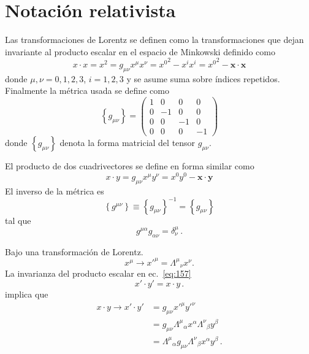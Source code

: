 \section{Notaci\'on relativista}
\label{sec:srn}
\begin{frame}
Las transformaciones de Lorentz se definen como la transformaciones que dejan invariante al producto escalar en el espacio de Minkowski definido como
\begin{equation}
  \label{eq:146}
 x\cdot x= x^2=g_{\mu\nu}x^\mu x^\nu={x^0}^2-x^i x^i={x^0}^2-\mathbf{x}\cdot\mathbf{x}
\end{equation}
donde $\mu,\nu=0,1,2,3$, $i=1,2,3$ y se asume suma sobre índices repetidos.
Finalmente la métrica usada se define como
\begin{equation}
  \label{eq:gmunu}
  \left\{ g_{\mu\nu} \right\}=
  \begin{pmatrix}
    1&0&0&0\\
    0&-1&0&0\\
    0&0&-1&0\\
    0&0&0&-1
  \end{pmatrix}
\end{equation}
donde $\left\{ g_{\mu\nu} \right\}$ denota la forma matricial del tensor $g_{\mu\nu}$.  



El producto de dos cuadrivectores se define en forma similar como
\begin{equation}
\label{eq:157}
  x\cdot y=g_{\mu\nu}x^\mu y^\nu=x^0y^0-\mathbf{x}\cdot\mathbf{y}
\end{equation}
El inverso de la métrica es
\begin{equation}
  \left\{ g^{\mu\nu} \right\}\equiv\left\{ g_{\mu\nu} \right\}^{-1}=\left\{ g_{\mu\nu} \right\}
\end{equation}
tal que
\begin{equation}
  g^{\mu\alpha}g_{\alpha\nu}=\delta^\mu_\nu\,.
\end{equation}

Bajo una transformación de Lorentz.
\begin{equation}
  \label{eq:xx5}
  x^\mu\to {x'}^\mu={\Lambda^\mu}_{\nu}x^\nu.
\end{equation}
La invarianza del producto escalar en ec.~\eqref{eq:157}
\begin{equation}
  {x'}\cdot {y'}=x\cdot y\,.
\end{equation}
implica que
\begin{align}
\label{eq:Lambdasteps}
{x}\cdot{y}\to  {x'}\cdot{y'}&=g_{\mu\nu}{x'}^\mu{y'}^{\nu}\nonumber\\
  &=g_{\mu\nu}{\Lambda^{\mu}}_{\alpha}x^{\alpha}{\Lambda^{\nu}}_{\beta}y^{\beta}\nonumber\\
 &={\Lambda^{\mu}}_{\alpha}g_{\mu\nu}{\Lambda^{\nu}}_{\beta}x^{\alpha}y^{\beta}\,.
\end{align}


\end{frame}
